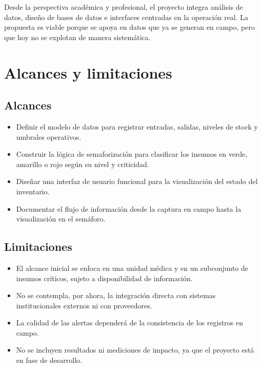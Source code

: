 Desde la perspectiva académica y profesional, el proyecto integra análisis de datos, diseño de bases de datos e interfaces centradas en la operación real. La propuesta es viable porque se apoya en datos que ya se generan en campo, pero que hoy no se explotan de manera sistemática.

\section{Alcances y limitaciones}
\label{sec:alcances_limitaciones}

\subsection{Alcances}
\label{subsec:alcances}

\begin{itemize}
    \item Definir el modelo de datos para registrar entradas, salidas, niveles de stock y umbrales operativos.
    \item Construir la lógica de semaforización para clasificar los insumos en verde, amarillo o rojo según su nivel y criticidad.
    \item Diseñar una interfaz de usuario funcional para la visualización del estado del inventario.
    \item Documentar el flujo de información desde la captura en campo hasta la visualización en el semáforo.
\end{itemize}

\subsection{Limitaciones}
\label{subsec:limitaciones}

\begin{itemize}
    \item El alcance inicial se enfoca en una unidad médica y en un subconjunto de insumos críticos, sujeto a disponibilidad de información.
    \item No se contempla, por ahora, la integración directa con sistemas institucionales externos ni con proveedores.
    \item La calidad de las alertas dependerá de la consistencia de los registros en campo.
    \item No se incluyen resultados ni mediciones de impacto, ya que el proyecto está en fase de desarrollo.
\end{itemize}

